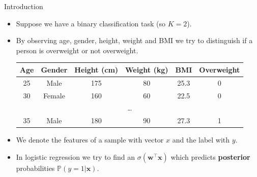 \documentclass[serif, aspectratio=169]{beamer}
\begin{document}
\begin{frame}{Introduction}
    \begin{itemize}
        \item Suppose we have a binary classification task (so $K=2$).
        \item By observing \textcolor{deepred}{age}, \textcolor{deepred}{gender}, \textcolor{deepred}{height}, \textcolor{deepred}{weight} and \textcolor{deepred}{BMI} we try to distinguish if a person is \textcolor{deepgreen}{overweight} or \textcolor{deepgreen}{not overweight}.
        
        
        \begin{table}[h!]
        \centering
        \begin{tabular}{|c|c|c|c|c|c|}
        \hline
        \textcolor{deepred}{Age} & \textcolor{deepred}{Gender} & \textcolor{deepred}{Height (cm)} & \textcolor{deepred}{Weight (kg)} & \textcolor{deepred}{BMI} & \textcolor{deepgreen}{Overweight} \\ \hline
        25 & Male & 175 & 80 & 25.3 & 0 \\ \hline
        30 & Female & 160 & 60 & 22.5 & 0 \\ \hline
        \multicolumn{6}{|c|}{\dots} \\ \hline
        35 & Male & 180 & 90 & 27.3 & 1 \\ \hline
        \end{tabular}
        \end{table}
        \item We denote the \textcolor{deepred}{features} of a sample with vector $x$ and the \textcolor{deepgreen}{label} with $y$.
        \item In logistic regression we try to find an $\sigma (\mathbf{w}^\top \mathbf{x})$ which predicts \textbf{posterior} probabilities $\mathbb{P}(y=1|\mathbf{x})$.
    \end{itemize}
    
\end{frame}
\end{document}
